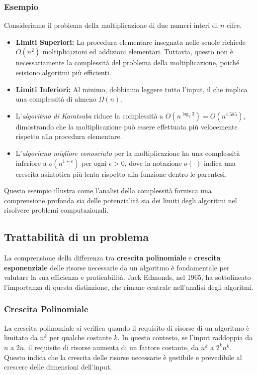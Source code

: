 \subsubsection{Esempio}
Consideriamo il problema della moltiplicazione di due numeri interi di \(n\) cifre.
\begin{itemize}
    \item \textbf{Limiti Superiori:} La procedura elementare insegnata nelle scuole
    richiede \(O(n^2)\) moltiplicazioni ed addizioni elementari. Tuttavia, questo non
    è necessariamente la complessità del problema della moltiplicazione, poiché esistono
    algoritmi più efficienti.
    \item \textbf{Limiti Inferiori:} Al minimo, dobbiamo leggere tutto l'input, il che
    implica una complessità di almeno \(\Omega(n)\).
    \item L'\textit{algoritmo di Karatsuba} riduce la complessità a
    \(O(n^{\log_2 3}) = O(n^{1.585})\), dimostrando che la moltiplicazione può essere
    effettuata più velocemente rispetto alla procedura elementare.
    \item L'\textit{algoritmo migliore conosciuto} per la moltiplicazione ha una
    complessità inferiore a \(o(n^{1+\epsilon})\) per ogni \(\epsilon > 0\), dove
    la notazione \(o(\cdot)\) indica una crescita asintotica più lenta rispetto alla
    funzione dentro le parentesi.
\end{itemize}

Questo esempio illustra come l'analisi della complessità fornisca una comprensione
profonda sia delle potenzialità sia dei limiti degli algoritmi nel risolvere problemi
computazionali.

\subsection{Trattabilità di un problema}
La comprensione della differenza tra \textbf{crescita polinomiale} e \textbf{crescita esponenziale}
delle risorse necessarie da un algoritmo è fondamentale per valutare la sua efficienza e praticabilità.
Jack Edmonds, nel 1965, ha sottolineato l'importanza di questa distinzione, che rimane centrale
nell'analisi degli algoritmi.

\subsubsection{Crescita Polinomiale}
La crescita polinomiale si verifica quando il requisito di risorse di un algoritmo è limitato
da \(n^k\) per qualche costante \(k\). In questo contesto, se l'input raddoppia da \(n\) a \(2n\),
il requisito di risorse aumenta di un fattore costante, da \(n^k\) a \(2^k n^k\). Questo indica che
la crescita delle risorse necessarie è gestibile e prevedibile al crescere delle dimensioni dell'input.

